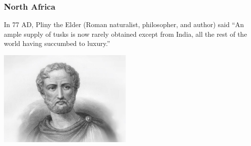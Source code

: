 \documentclass[10pt]{beamer}
\begin{document}
\begin{frame}[t]
\frametitle{North Africa}
\vspace{0.5cm}
		
	In 77 AD, Pliny the Elder (Roman naturalist, philosopher, and author) said ``An ample supply of tusks is now rarely obtained except from India, all the rest of the world having succumbed to luxury.''\\
	
	\vspace{0.25cm}
	
	\begin{center}
		\includegraphics[width=0.5\textwidth]{figures/pliny.jpg}
	\end{center}
	
\end{frame}
\end{document}
